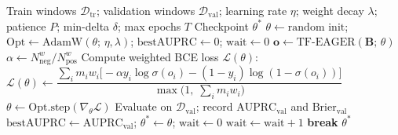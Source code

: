 \documentclass{article}
\begin{document}
\begin{algorithm}[H]
\caption{TF-EAGER Training with Weighted BCE and Early Stopping}
\label{alg:training}
\begin{algorithmic}[1]
\Require Train windows $\mathcal{D}_{\mathrm{tr}}$; validation windows $\mathcal{D}_{\mathrm{val}}$;
         learning rate $\eta$; weight decay $\lambda$;
         patience $P$; min-delta $\delta$; max epochs $T$
\Ensure  Checkpoint $\theta^*$
\State $\theta \leftarrow \text{random init}$;\;
       $\mathrm{Opt} \leftarrow \mathrm{AdamW}(\theta;\,\eta,\lambda)$;\;
       $\mathrm{bestAUPRC} \leftarrow 0$;\;
       $\mathrm{wait} \leftarrow 0$
    \State $\mathbf{o} \leftarrow \mathrm{TF\text{-}EAGER}(\mathbf{B};\,\theta)$
    \State $\alpha \leftarrow N_{\mathrm{neg}}^{w} / N_{\mathrm{pos}}^{w}$
    \State Compute weighted BCE loss $\mathcal{L}(\theta)$:
    \Statex \quad $\mathcal{L}(\theta) \leftarrow \dfrac{\sum_i m_i w_i \bigl[-\alpha y_i \log \sigma(o_i) - (1-y_i)\log(1-\sigma(o_i))\bigr]}{\max\!\bigl(1,\;\sum_i m_i w_i\bigr)}$
    \State $\theta \leftarrow \mathrm{Opt.step}(\nabla_\theta \mathcal{L})$
  \EndFor
  \State Evaluate on $\mathcal{D}_{\mathrm{val}}$; record $\mathrm{AUPRC}_{\mathrm{val}}$ and $\mathrm{Brier}_{\mathrm{val}}$
    \State $\mathrm{bestAUPRC} \leftarrow \mathrm{AUPRC}_{\mathrm{val}}$;\;
           $\theta^* \leftarrow \theta$;\;
           $\mathrm{wait} \leftarrow 0$
  \Else
    \State $\mathrm{wait} \leftarrow \mathrm{wait} + 1$
      \State \textbf{break} 
    \EndIf
  \EndIf
\EndFor
\State \Return $\theta^*$
\end{algorithmic}
\end{algorithm}
\end{document}
